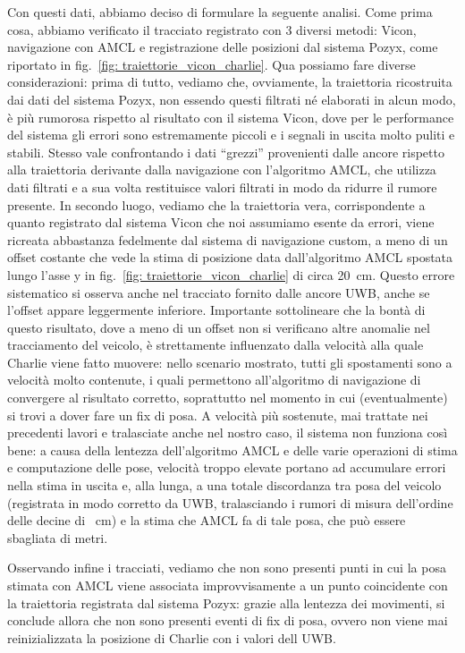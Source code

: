 Con questi dati, abbiamo deciso di formulare la seguente analisi.
Come prima cosa, abbiamo verificato il tracciato registrato con 3 diversi metodi: Vicon, navigazione con AMCL e registrazione delle posizioni dal sistema Pozyx, come riportato in fig.~\ref{fig: traiettorie_vicon_charlie}.
Qua possiamo fare diverse considerazioni: prima di tutto, vediamo che, ovviamente, la traiettoria ricostruita dai dati del sistema Pozyx, non essendo questi filtrati né elaborati in alcun modo, è più rumorosa rispetto al risultato con il sistema Vicon, dove per le performance del sistema gli errori sono estremamente piccoli e i segnali in uscita molto puliti e stabili. Stesso vale confrontando i dati ``grezzi'' provenienti dalle ancore rispetto alla traiettoria derivante dalla navigazione con l'algoritmo AMCL, che utilizza dati filtrati e a sua volta restituisce valori filtrati in modo da ridurre il rumore presente. 
In secondo luogo, vediamo che la traiettoria vera, corrispondente a quanto registrato dal sistema Vicon che noi assumiamo esente da errori, viene ricreata abbastanza fedelmente dal sistema di navigazione custom, a meno di un offset costante che vede la stima di posizione data dall'algoritmo AMCL spostata lungo l'asse y in fig.~\ref{fig: traiettorie_vicon_charlie} di circa \SI{20}{\centi \metre}. Questo errore sistematico si osserva anche nel tracciato fornito dalle ancore UWB, anche se l'offset appare leggermente inferiore.
Importante sottolineare che la bontà di questo risultato, dove a meno di un offset non si verificano altre anomalie nel tracciamento del veicolo, è strettamente influenzato dalla velocità alla quale Charlie viene fatto muovere: nello scenario mostrato, tutti gli spostamenti sono a velocità molto contenute, i quali permettono all'algoritmo di navigazione di convergere al risultato corretto, soprattutto nel momento in cui (eventualmente) si trovi a dover fare un fix di posa. A velocità più sostenute, mai trattate nei precedenti lavori e tralasciate anche nel nostro caso, il sistema non funziona così bene: a causa della lentezza dell'algoritmo AMCL e delle varie operazioni di stima e computazione delle pose, velocità troppo elevate portano ad accumulare errori nella stima in uscita e, alla lunga, a una totale discordanza tra posa del veicolo (registrata in modo corretto da UWB, tralasciando i rumori di misura dell'ordine delle decine di \SI{}{\centi \metre}) e la stima che AMCL fa di tale posa, che può essere sbagliata di metri.

Osservando infine i tracciati, vediamo che non sono presenti punti in cui la posa stimata con AMCL viene associata improvvisamente a un punto coincidente con la traiettoria registrata dal sistema Pozyx: grazie alla lentezza dei movimenti, si conclude allora che non sono presenti eventi di fix di posa, ovvero non viene mai reinizializzata la posizione di Charlie con i valori dell UWB.

